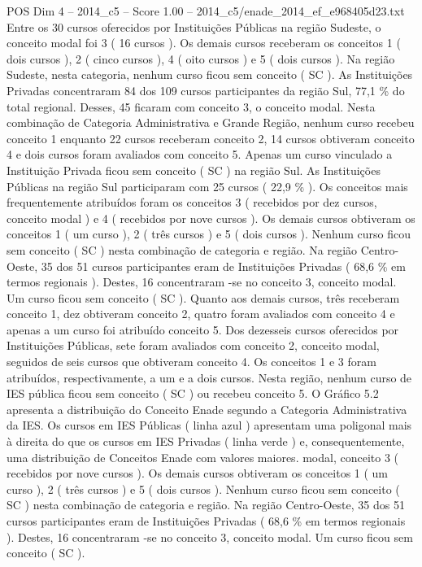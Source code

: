 \begin{textsample}{POS Dim 4 – 2014\_c5 – Score 1.00 – 2014\_c5/enade\_2014\_ef\_e968405d23.txt}
Entre os 30 cursos oferecidos por Instituições Públicas na região Sudeste, o conceito modal foi 3 ( 16 cursos ).
Os demais cursos receberam os conceitos 1 ( dois cursos ), 2 ( cinco cursos ), 4 ( oito cursos ) e 5 ( dois cursos ).
Na região Sudeste, nesta categoria, nenhum curso ficou sem conceito ( SC ).
As Instituições Privadas concentraram 84 dos 109 cursos participantes da região Sul, 77,1 \% do total regional.
Desses, 45 ficaram com conceito 3, o conceito modal.
Nesta combinação de Categoria Administrativa e Grande Região, nenhum curso recebeu conceito 1 enquanto 22 cursos receberam conceito 2, 14 cursos obtiveram conceito 4 e dois cursos foram avaliados com conceito 5.
Apenas um curso vinculado a Instituição Privada ficou sem conceito ( SC ) na região Sul.
As Instituições Públicas na região Sul participaram com 25 cursos ( 22,9 \% ).
Os conceitos mais frequentemente atribuídos foram os conceitos 3 ( recebidos por dez cursos, conceito modal ) e 4 ( recebidos por nove cursos ).
Os demais cursos obtiveram os conceitos 1 ( um curso ), 2 ( três cursos ) e 5 ( dois cursos ).
Nenhum curso ficou sem conceito ( SC ) nesta combinação de categoria e região.
Na região Centro-Oeste, 35 dos 51 cursos participantes eram de Instituições Privadas ( 68,6 \% em termos regionais ).
Destes, 16 concentraram -se no conceito 3, conceito modal.
Um curso ficou sem conceito ( SC ).
Quanto aos demais cursos, três receberam conceito 1, dez obtiveram conceito 2, quatro foram avaliados com conceito 4 e apenas a um curso foi atribuído conceito 5.
Dos dezesseis cursos oferecidos por Instituições Públicas, sete foram avaliados com conceito 2, conceito modal, seguidos de seis cursos que obtiveram conceito 4.
Os conceitos 1 e 3 foram atribuídos, respectivamente, a um e a dois cursos.
Nesta região, nenhum curso de IES pública ficou sem conceito ( SC ) ou recebeu conceito 5.
O Gráfico 5.2 apresenta a distribuição do Conceito Enade segundo a Categoria Administrativa da IES.
Os cursos em IES Públicas ( linha azul ) apresentam uma poligonal mais à direita do que os cursos em IES Privadas ( linha verde ) e, consequentemente, uma distribuição de Conceitos Enade com valores maiores. modal, conceito 3 ( recebidos por nove cursos ).
Os demais cursos obtiveram os conceitos 1 ( um curso ), 2 ( três cursos ) e 5 ( dois cursos ).
Nenhum curso ficou sem conceito ( SC ) nesta combinação de categoria e região.
Na região Centro-Oeste, 35 dos 51 cursos participantes eram de Instituições Privadas ( 68,6 \% em termos regionais ).
Destes, 16 concentraram -se no conceito 3, conceito modal.
Um curso ficou sem conceito ( SC ).

\end{textsample}

